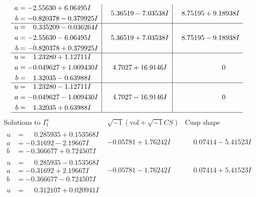 \documentclass[1p]{elsarticle_modified}
\theoremstyle{definition}
\newcommand{\I}{\sqrt{-1}}
\begin{document}
$$\begin{array}{c|c|c}
\begin{aligned}
a &= -2.55630 + 6.06495 I \\
b &= -0.820378 - 0.379925 I\end{aligned}
 & \phantom{-}5.36519 - 7.03538 I & \phantom{-}8.75195 + 9.18938 I \\ \hline\begin{aligned}
u &= \phantom{-}0.335209 - 0.036264 I \\
a &= -2.55630 - 6.06495 I \\
b &= -0.820378 + 0.379925 I\end{aligned}
 & \phantom{-}5.36519 + 7.03538 I & \phantom{-}8.75195 - 9.18938 I \\ \hline\begin{aligned}
u &= \phantom{-}1.23280 + 1.12711 I \\
a &= -0.049627 + 1.009430 I \\
b &= \phantom{-}1.32035 - 0.63988 I\end{aligned}
 & \phantom{-}4.7027 + 16.9146 I & \phantom{-0.000000 } 0 \\ \hline\begin{aligned}
u &= \phantom{-}1.23280 - 1.12711 I \\
a &= -0.049627 - 1.009430 I \\
b &= \phantom{-}1.32035 + 0.63988 I\end{aligned}
 & \phantom{-}4.7027 - 16.9146 I & \phantom{-0.000000 } 0\\
 \hline 
 \end{array}$$\newpage$$\begin{array}{c|c|c}  
\text{Solutions to }I^u_{1}& \I (\text{vol} + \sqrt{-1}CS) & \text{Cusp shape}\\
 \hline 
\begin{aligned}
u &= \phantom{-}0.285935 + 0.153568 I \\
a &= -0.31692 - 2.19667 I \\
b &= -0.366677 + 0.724507 I\end{aligned}
 & -0.05781 + 1.76242 I & \phantom{-}0.07414 - 5.41523 I \\ \hline\begin{aligned}
u &= \phantom{-}0.285935 - 0.153568 I \\
a &= -0.31692 + 2.19667 I \\
b &= -0.366677 - 0.724507 I\end{aligned}
 & -0.05781 - 1.76242 I & \phantom{-}0.07414 + 5.41523 I \\ \hline\begin{aligned}
u &= \phantom{-}0.312107 + 0.020941 I \\

\end{aligned}
\end{array}$$
\end{document}
